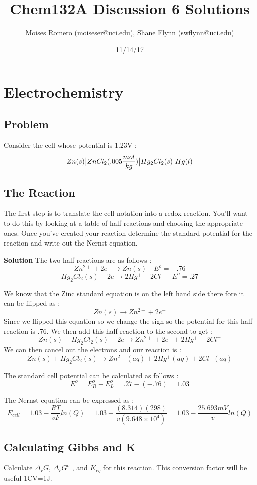 \documentclass{article}
\title{Chem132A Discussion 6 Solutions}
\author{Moises Romero (moiseser@uci.edu), Shane Flynn (swflynn@uci.edu) }
\date{11/14/17}
\newcommand{\be}{\begin{equation}}
\newcommand{\ee}{\end{equation}}
\begin{document}
\maketitle

\section{Electrochemistry}
\subsection{Problem}
Consider the cell whose potential is 1.23V :
\be
Zn(s)\big|ZnCl_2(.005\small{\frac{mol}{kg}})\big|Hg_2Cl_2(s)\big|Hg(l)
\ee
\subsection{The Reaction}
The first step is to translate the cell notation into a redox reaction. 
You'll want to do this by looking at a table of half reactions and choosing the appropriate ones. 
Once you've created your reaction determine the standard potential for the reaction and write out the Nernst equation. 

\bigskip
\textbf{Solution} 
The two half reactions are as follows : 
\be
Zn^{2+} + 2e^- \rightarrow Zn(s) \quad E^o = -.76
\ee
\be
Hg_2Cl_2(s) + 2e \rightarrow 2Hg^+ + 2Cl^- \quad E^o = .27
\ee

We know that the Zinc standard equation is on the left hand side there fore it can be flipped as : 
\be
Zn(s) \rightarrow Zn^{2+} + 2e^- 
\ee
Since we flipped this equation so we change the sign so the potential for this half reaction is .76. We then add this half reaction to the second to get : 
\be
Zn(s) + Hg_2Cl_2(s) + 2e \rightarrow Zn^{2+} + 2e^- + 2Hg^+ + 2Cl^-
\ee
We can then cancel out the electrons and our reaction is : 
\be
Zn(s) + Hg_2Cl_2(s) \rightarrow Zn^{2+}(aq) + 2Hg^+(aq) + 2Cl^-(aq)
\ee

The standard cell potential can be calculated as follows : 
\be
E^o = E^o_R - E^o_L = .27 - (-.76) = 1.03
\ee

The Nernst equation can be expressed as : 
\be
E_{cell} = 1.03 - \frac{RT}{vF}ln(Q) = 1.03 - \frac{(8.314)(298)}{v(9.648 \times 10^4)} = 1.03 - \frac{25.693mV}{v}ln(Q)
\ee


\subsection{Calculating Gibbs and K}
Calculate $\Delta_r G$, $\Delta_r G^o$ , and $K_{eq}$ for this reaction. 
This conversion factor will be useful 1CV=1J. 
\end{document}
